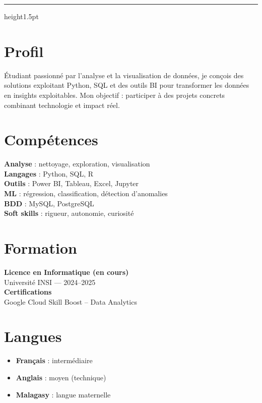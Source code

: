 \documentclass[a4paper,12pt]{article}
\begin{document}
\vspace{0.4cm}
\hrule height1.5pt
\vspace{0.4cm}

\begin{minipage}[t]{0.38\textwidth}

\section*{Profil}
Étudiant passionné par l'analyse et la visualisation de données, je conçois des solutions exploitant Python, SQL et des outils BI pour transformer les données en insights exploitables. Mon objectif : participer à des projets concrets combinant technologie et impact réel.

\section*{Compétences}
\begin{skillbox}
\textbf{Analyse} : nettoyage, exploration, visualisation\\
\textbf{Langages} : Python, SQL, R\\
\textbf{Outils} : Power BI, Tableau, Excel, Jupyter\\
\textbf{ML} : régression, classification, détection d'anomalies\\
\textbf{BDD} : MySQL, PostgreSQL\\
\textbf{Soft skills} : rigueur, autonomie, curiosité
\end{skillbox}

\section*{Formation}
\textbf{Licence en Informatique (en cours)}\\
Université INSI — 2024–2025\\[4pt]
\textbf{Certifications}\\
Google Cloud Skill Boost – Data Analytics

\section*{Langues}
\begin{itemize}[leftmargin=*, label={}]
  \item \textbf{Français} : intermédiaire
  \item \textbf{Anglais} : moyen (technique)
  \item \textbf{Malagasy} : langue maternelle
\end{itemize}

\end{minipage}
\end{document}
